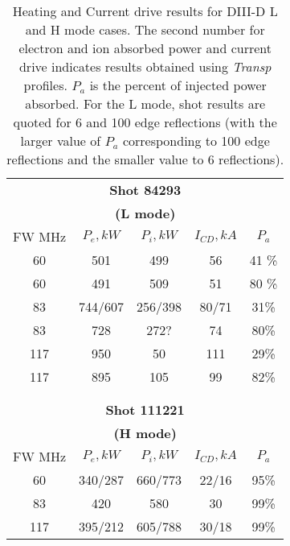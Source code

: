 \begin{table}
 \begin{centering}
  \begin{tabular}{ccccc}
   \multicolumn{5}{c}{\bfseries Shot 84293} \\
   \multicolumn{5}{c}{\bfseries (L mode) }  \\ 
   FW MHz& $P_e ,kW $ & $P_i, kW  $ & $ I_{CD}, kA  $ & $P_a $ \\ \hline
   60  & 501& 499 & 56& 41 \%  \\
   60  & 491& 509 & 51& 80 \%  \\
   83  & 744/607& 256/398  &  80/71 & 31\%   \\
   83  & 728 & 272?   &  74 & 80\%   \\
   117  &950  &50 & 111 & 29\%  \\
   117  &895  &105 & 99 & 82\%  \\
   \\ \hline 
   & \\
   \multicolumn{5}{c}{\bfseries Shot 111221} \\
   \multicolumn{5}{c}{\bfseries (H
   mode)} \\ 
   FW MHz& $P_e, kW$ & $P_i ,kW $ & $ I_{CD}, kA $&  $P_a $ \\ \hline
   60  &340/287& 660/773 & 22/16 & 95\% \\
   83  & 420 & 580 & 30  & 99\% \\
   117 & 395/212 & 605/788 & 30/18 & 99\% \\ \hline
  \end{tabular}
  \caption{Heating and Current drive results for DIII-D L and H
  mode cases. The second number for electron and ion absorbed power and
  current drive indicates results obtained using \emph{Transp}
  profiles. $P_a$ is the percent of injected power absorbed. For the
  L mode, shot results are quoted for 6  and 100 edge reflections (with
  the larger value of $P_a$ corresponding to 100 edge reflections and
  the smaller value to 6 reflections).}
  \label{t1a}
 \end{centering}
\end{table} 
